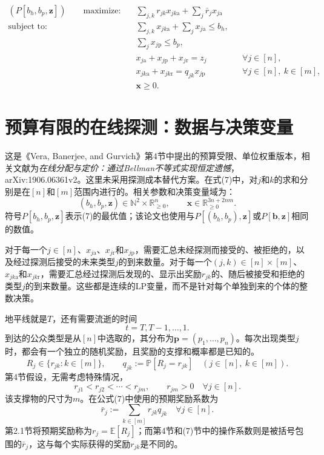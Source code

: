 \documentclass{article}
\begin{document}
\begin{equation}
\begin{aligned}
(P[b_h,b_p,\mathbf z])\qquad \text{maximize:}\quad
 &\sum_{j,k}r_{jk}x_{jk\mathrm a}+\sum_j\bar r_jx_{j\mathrm a}\\
\text{subject to:}\quad
 &\sum_{j,k}x_{jk\mathrm a}+\sum_jx_{j\mathrm a}\le b_h,\\
 &\sum_jx_{j\mathrm p}\le b_p,\\
 &x_{j\mathrm a}+x_{j\mathrm p}+x_{j\mathrm r}=z_j
 &&\forall j\in[n],\\
 &x_{jk\mathrm a}+x_{jk\mathrm r}=q_{jk}x_{j\mathrm p}
 &&\forall j\in[n],\ k\in[m],\\
 &\mathbf x\ge0.
\end{aligned}\tag{7}
\end{equation}

\section*{预算有限的在线探测：数据与决策变量}
这是《Vera, Banerjee, and Gurvich》第4节中提出的预算受限、单位权重版本，相关文献为\emph{在线分配与定价：通过Bellman不等式实现恒定遗憾}，arXiv:1906.06361v2。这里未采用探测成本替代方案。在式(7)中，对$j$和$k$的求和分别是在$[n]$和$[m]$范围内进行的。相关参数和决策变量域为：
\[
(b_h,b_p,\mathbf z)\in\mathbb N^2\times\mathbb R_{\ge0}^{n},
\qquad
\mathbf x\in\mathbb R_{\ge0}^{3n+2nm}.
\]
符号$P[b_h,b_p,\mathbf z]$表示(7)的最优值；该论文也使用与$P[(b_h,b_p),\mathbf z]$或$P[\mathbf b,\mathbf z]$相同的数值。

对于每一个$j\in[n]$、$x_{j\mathrm a}$、$x_{j\mathrm r}$和$x_{j\mathrm p}$，需要汇总未经探测而接受的、被拒绝的，以及经过探测后接受的未来类型$j$的到来数量。对于每一个$(j,k)\in[n]\times[m]$、$x_{jk\mathrm a}$和$x_{jk\mathrm r}$，需要汇总经过探测后发现的、显示出奖励$r_{jk}$的、随后被接受和拒绝的类型$j$的到来数量。这些都是连续的LP变量，而不是针对每个单独到来的个体的整数决策。

地平线就是$T$，还有需要流逝的时间
\[
t=T,T-1,\ldots,1.
\]
到达的公众类型是从$[n]$中选取的，其分布为$\mathbf p=(p_1,\ldots,p_n)$。每次出现类型$j$时，都会有一个独立的随机奖励，且奖励的支撑和概率都是已知的。
\[
R_j\in\{r_{jk}:k\in[m]\},\qquad
q_{jk}:=\mathbb P[R_j=r_{jk}]
\quad(j\in[n],\ k\in[m]).
\]
第4节假设，无需考虑特殊情况，
\[
r_{j1}<r_{j2}<\cdots<r_{jm},\qquad r_{jm}>0
\quad\forall j\in[n].
\]
该支撑物的尺寸为$m$。在公式(7)中使用的预期奖励系数为
\[
\bar r_j:=\sum_{k\in[m]}r_{jk}q_{jk}\quad\forall j\in[n].
\]
第2.1节将预期奖励称为$r_j=\mathbb E[R_j]$；而第4节和(7)节中的操作系数则是被括号包围的$\bar r_j$，这与每个实际获得的奖励$r_{jk}$是不同的。
\end{document}
